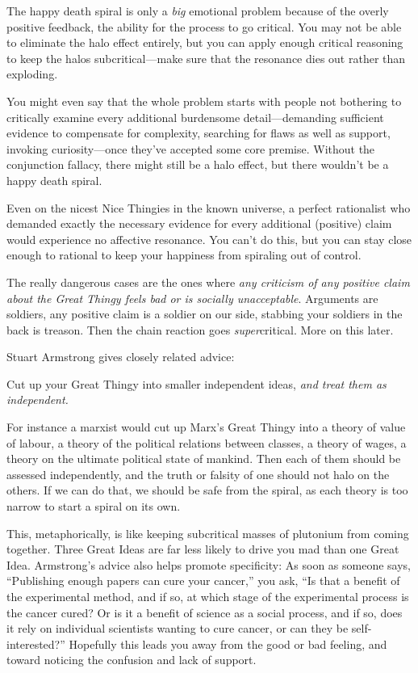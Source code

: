 {
 The happy death spiral is only a \textit{big} emotional problem
because of the overly positive feedback, the ability for the process to
go critical. You may not be able to eliminate the halo effect entirely,
but you can apply enough critical reasoning to keep the halos
subcritical---make sure that the resonance dies out rather than
exploding.}

{
 You might even say that the whole problem starts with people not
bothering to critically examine every additional burdensome
detail---demanding sufficient evidence to compensate for complexity,
searching for flaws as well as support, invoking curiosity---once
they've accepted some core premise. Without the
conjunction fallacy, there might still be a halo effect, but there
wouldn't be a happy death spiral.}

{
 Even on the nicest Nice Thingies in the known universe, a perfect
rationalist who demanded exactly the necessary evidence for every
additional (positive) claim would experience no affective resonance.
You can't do this, but you can stay close enough to
rational to keep your happiness from spiraling out of control.}

{
 The really dangerous cases are the ones where \textit{any
criticism of any positive claim about the Great Thingy feels bad or is
socially unacceptable}. Arguments are soldiers, any positive claim is a
soldier on our side, stabbing your soldiers in the back is treason.
Then the chain reaction goes \textit{super}critical. More on this
later.}

{
 Stuart Armstrong gives closely related advice:}

{
 Cut up your Great Thingy into smaller independent ideas,
\textit{and treat them as independent.}}

{
 For instance a marxist would cut up Marx's Great
Thingy into a theory of value of labour, a theory of the political
relations between classes, a theory of wages, a theory on the ultimate
political state of mankind. Then each of them should be assessed
independently, and the truth or falsity of one should not halo on the
others. If we can do that, we should be safe from the spiral, as each
theory is too narrow to start a spiral on its own.}

{
 This, metaphorically, is like keeping subcritical masses of
plutonium from coming together. Three Great Ideas are far less likely
to drive you mad than one Great Idea. Armstrong's
advice also helps promote specificity: As soon as someone says,
``Publishing enough papers can cure your
cancer,'' you ask, ``Is that a
benefit of the experimental method, and if so, at which stage of the
experimental process is the cancer cured? Or is it a benefit of science
as a social process, and if so, does it rely on individual scientists
wanting to cure cancer, or can they be
self-interested?'' Hopefully this leads you away from
the good or bad feeling, and toward noticing the confusion and lack of
support.}

